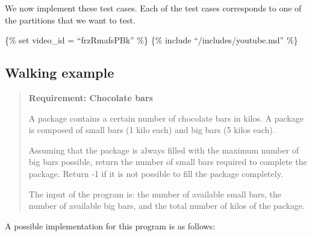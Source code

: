 We now implement these test cases. Each of the test cases corresponds to
one of the partitions that we want to test.

\{\% set video\_id = ``frzRmafsPBk'' \%\} \{\% include
``/includes/youtube.md'' \%\}

\hypertarget{walking-example}{%
\subsection{Walking example}\label{walking-example}}

\begin{quote}
\textbf{Requirement: Chocolate bars}

A package contains a certain number of chocolate bars in kilos. A
package is composed of small bars (1 kilo each) and big bars (5 kilos
each).

Assuming that the package is always filled with the maximum number of
big bars possible, return the number of small bars required to complete
the package. Return -1 if it is not possible to fill the package
completely.

The input of the program is: the number of available small bars, the
number of available big bars, and the total number of kilos of the
package.
\end{quote}

A possible implementation for this program is as follows:

\begin{Shaded}
\begin{Highlighting}[]
 

       \NormalTok{;}

      \NormalTok{(}
        \NormalTok{;}
\NormalTok{);}


\NormalTok{    \}}
\NormalTok{\}}
\end{Highlighting}
\end{Shaded}

